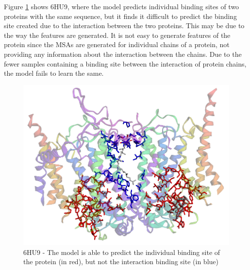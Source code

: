 \documentclass[journal=jacsat,manuscript=article]{achemso}
\begin{document}
Figure \ref{fig:6hu9} shows 6HU9\cite{maldonado2021atomic}, where the model predicts individual binding sites of two proteins with the same sequence, but it finds it difficult to predict the binding site created due to the interaction between the two proteins. This may be due to the way the features are generated. It is not easy to generate features of the protein since the MSAs are generated for individual chains of a protein, not providing any information about the interaction between the chains. Due to the fewer samples containing a binding site between the interaction of protein chains, the model fails to learn the same.
\begin{figure}
    \centering
    \noindent\includegraphics[scale=0.35]{6hu9.png}
    \caption{\centering 6HU9 - The model is able to predict the individual binding site of the protein  (in red), but not the interaction binding site (in blue)}
    \label{fig:6hu9}
\end{figure}
\end{document}
